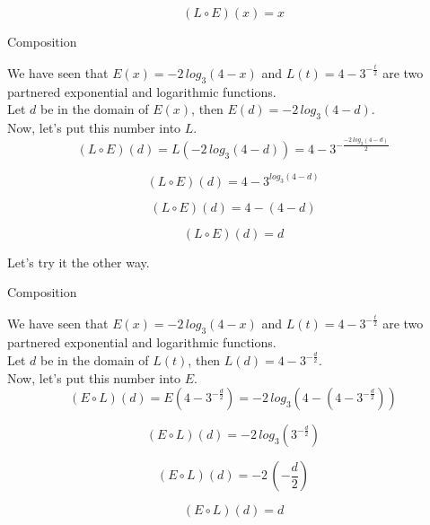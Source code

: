 \documentclass{ximera}
\begin{document}
\[   (L \circ E)(x) = x        \]




\begin{example}  Composition

We have seen that $E(x) = -2 \,log_3(4-x)$ and $L(t) = 4 - 3^{-\frac{t}{2}}$ are two partnered exponential and logarithmic functions. \\


Let $d$ be in the domain of $E(x)$, then $E(d) = -2 \,log_3(4-d)$. \\

Now, let's put this number into $L$. \\



\[    (L \circ E)(d)  =  L(-2 \,log_3(4-d)) = 4 - 3^{-\frac{-2 \,log_3(4-d)}{2}}              \]


\[    (L \circ E)(d)  =  4 - 3^{log_3(4-d)}              \]


\[    (L \circ E)(d)  =  4 - (4-d)             \]


\[    (L \circ E)(d)  = d             \]


\end{example}




Let's try it the other way.










\begin{example}  Composition

We have seen that $E(x) = -2 \,log_3(4-x)$ and $L(t) = 4 - 3^{-\frac{t}{2}}$ are two partnered exponential and logarithmic functions. \\


Let $d$ be in the domain of $L(t)$, then $L(d) = 4 - 3^{-\frac{d}{2}}$. \\

Now, let's put this number into $E$. \\



\[    (E \circ L)(d)  =  E(4 - 3^{-\frac{d}{2}}) = -2 \,log_3(4 - (4 - 3^{-\frac{d}{2}}))            \]


\[    (E \circ L)(d)  =  -2 \,log_3( 3^{-\frac{d}{2}})              \]


\[    (E \circ L)(d)  = -2 \, \left(-\frac{d}{2}\right)              \]


\[    (E \circ L)(d)  = d            \]


\end{example}
\end{document}
